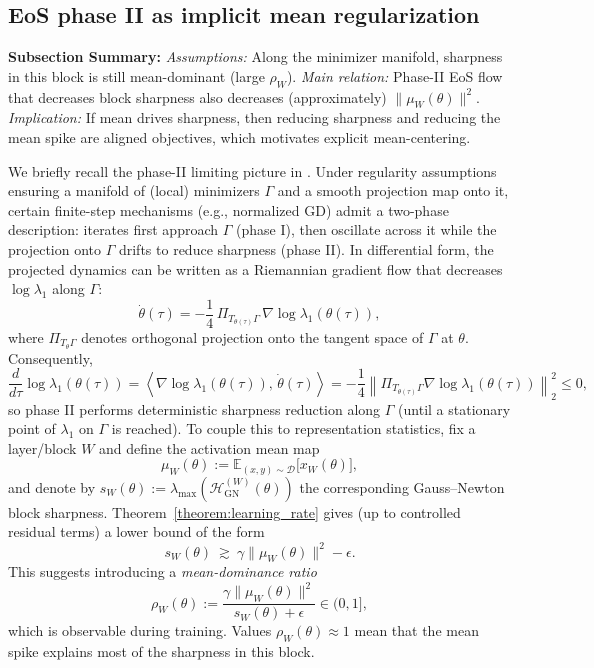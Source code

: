 \documentclass[11pt]{article}
\begin{document}
\subsection{EoS phase II as implicit mean regularization}

\textbf{Subsection Summary:}
\textit{Assumptions:} Along the minimizer manifold, sharpness in this block is still mean-dominant (large $\rho_W$).
\textit{Main relation:} Phase-II EoS flow that decreases block sharpness also decreases (approximately) $\|\mu_W(\theta)\|^2$.
\textit{Implication:} If mean drives sharpness, then reducing sharpness and reducing the mean spike are aligned objectives, which motivates explicit mean-centering.

We briefly recall the phase-II limiting picture in \citet{arora2022understanding}. Under regularity assumptions ensuring a manifold of (local) minimizers $\Gamma$ and a smooth projection map onto it, certain finite-step mechanisms (e.g., normalized GD) admit a two-phase description: iterates first approach $\Gamma$ (phase I), then oscillate across it while the projection onto $\Gamma$ drifts to reduce sharpness (phase II).
In differential form, the projected dynamics can be written as a Riemannian gradient flow that decreases $\log\lambda_1$ along $\Gamma$:
\begin{equation}\label{eq:arora_flow}
\dot\theta(\tau) 
=
-\frac14\,\Pi_{T_{\theta(\tau)}\Gamma}\,\nabla \log \lambda_1(\theta(\tau)),
\end{equation}
where $\Pi_{T_\theta\Gamma}$ denotes orthogonal projection onto the tangent space of $\Gamma$ at $\theta$.
Consequently,
\[
\frac{d}{d\tau}\log\lambda_1(\theta(\tau))
=
\left\langle \nabla\log\lambda_1(\theta(\tau)),\,\dot\theta(\tau)\right\rangle
=
-\frac14\left\|\Pi_{T_{\theta(\tau)}\Gamma}\nabla\log\lambda_1(\theta(\tau))\right\|_2^2
\le 0,
\]
so phase II performs deterministic sharpness reduction along $\Gamma$ (until a stationary point of $\lambda_1$ on $\Gamma$ is reached).
To couple this to representation statistics, fix a layer/block $W$ and define the activation mean map
\[
\mu_W(\theta) := \mathbb{E}_{(x,y)\sim\mathcal{D}}\bigl[x_W(\theta)\bigr],
\]
and denote by $s_W(\theta):=\lambda_{\max}(\mathcal{H}_{\mathrm{GN}}^{(W)}(\theta))$ the corresponding Gauss--Newton block sharpness.
Theorem~\ref{theorem:learning_rate} gives (up to controlled residual terms) a lower bound of the form
\[
s_W(\theta)\ \gtrsim\ \gamma\|\mu_W(\theta)\|^2-\epsilon.
\]
This suggests introducing a \emph{mean-dominance ratio}
\begin{equation}\label{eq:mean_ratio}
\rho_W(\theta)
:=
\frac{\gamma\|\mu_W(\theta)\|^2}{s_W(\theta)+\epsilon}
\in(0,1],
\end{equation}
which is observable during training. Values $\rho_W(\theta)\approx 1$ mean that the mean spike explains most of the sharpness in this block.
\end{document}
